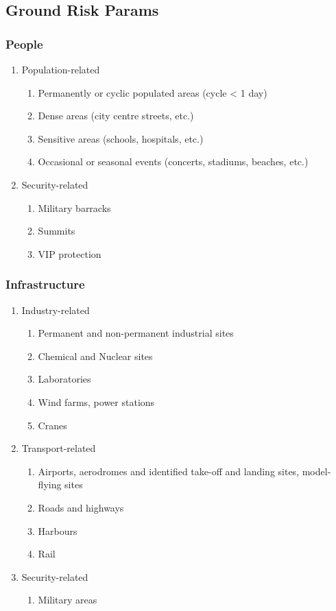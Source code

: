 \documentclass{ua_wgs_base}
\begin{document}
\subsection{Ground Risk Params}

\subsubsection{People}
\begin{enumerate}
\item Population-related
\begin{enumerate}
\item Permanently or cyclic populated areas (cycle < 1 day)
\item Dense areas (city centre streets, etc.)
\item Sensitive areas (schools, hospitals, etc.)
\item Occasional or seasonal events (concerts, stadiums, beaches, etc.)
\end{enumerate}
\item Security-related
\begin{enumerate}
\item Military barracks
\item Summits
\item VIP protection
\end{enumerate}
\end{enumerate}

\subsubsection{Infrastructure}
\begin{enumerate}
\item Industry-related
\begin{enumerate}
\item Permanent and non-permanent industrial sites
\item Chemical and Nuclear sites
\item Laboratories
\item Wind farms, power stations
\item Cranes
\end{enumerate}
\item Transport-related
\begin{enumerate}
\item Airports, aerodromes and identified take-off and landing sites, model-flying
sites
\item Roads and highways
\item Harbours
\item Rail
\end{enumerate}
\item Security-related
\begin{enumerate}
\item Military areas
\end{enumerate}
\end{enumerate}
\end{document}
